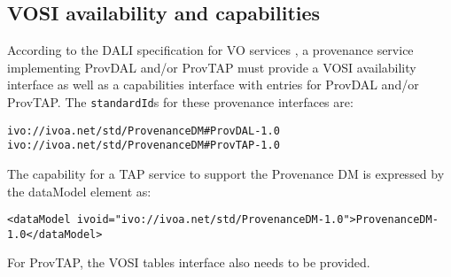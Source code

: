 



\subsection{VOSI availability and capabilities}
According to the DALI specification for VO services \citep{std:DALI}, a provenance service implementing ProvDAL and/or ProvTAP must provide a VOSI availability interface as well as a capabilities interface with entries for ProvDAL and/or ProvTAP. The \texttt{standardId}s for these provenance interfaces are:

\begin{verbatim}
ivo://ivoa.net/std/ProvenanceDM#ProvDAL-1.0
ivo://ivoa.net/std/ProvenanceDM#ProvTAP-1.0
\end{verbatim}

The capability for a TAP service to support the Provenance DM is expressed by
the dataModel element as:
\begin{verbatim}
<dataModel ivoid="ivo://ivoa.net/std/ProvenanceDM-1.0">ProvenanceDM-1.0</dataModel>
\end{verbatim}

For ProvTAP, the VOSI tables interface also needs to be provided.

